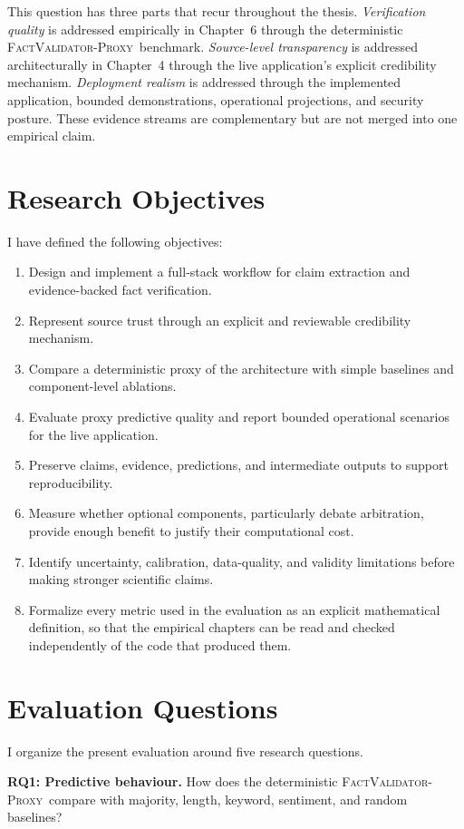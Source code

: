 \documentclass[12pt,a4paper,openany]{report}
\newcommand{\proxy}{\textsc{FactValidator-Proxy}}
\begin{document}
This question has three parts that recur throughout the thesis. \emph{Verification quality} is addressed empirically in Chapter~6 through the deterministic \proxy\ benchmark. \emph{Source-level transparency} is addressed architecturally in Chapter~4 through the live application's explicit credibility mechanism. \emph{Deployment realism} is addressed through the implemented application, bounded demonstrations, operational projections, and security posture. These evidence streams are complementary but are not merged into one empirical claim.

\section{Research Objectives}
I have defined the following objectives:
\begin{enumerate}
  \item Design and implement a full-stack workflow for claim extraction and evidence-backed fact verification.
  \item Represent source trust through an explicit and reviewable credibility mechanism.
  \item Compare a deterministic proxy of the architecture with simple baselines and component-level ablations.
  \item Evaluate proxy predictive quality and report bounded operational scenarios for the live application.
  \item Preserve claims, evidence, predictions, and intermediate outputs to support reproducibility.
  \item Measure whether optional components, particularly debate arbitration, provide enough benefit to justify their computational cost.
  \item Identify uncertainty, calibration, data-quality, and validity limitations before making stronger scientific claims.
  \item Formalize every metric used in the evaluation as an explicit mathematical definition, so that the empirical chapters can be read and checked independently of the code that produced them.
\end{enumerate}

\section{Evaluation Questions}
I organize the present evaluation around five research questions.

\textbf{RQ1: Predictive behaviour.} How does the deterministic \proxy\ compare with majority, length, keyword, sentiment, and random baselines?
\end{document}
